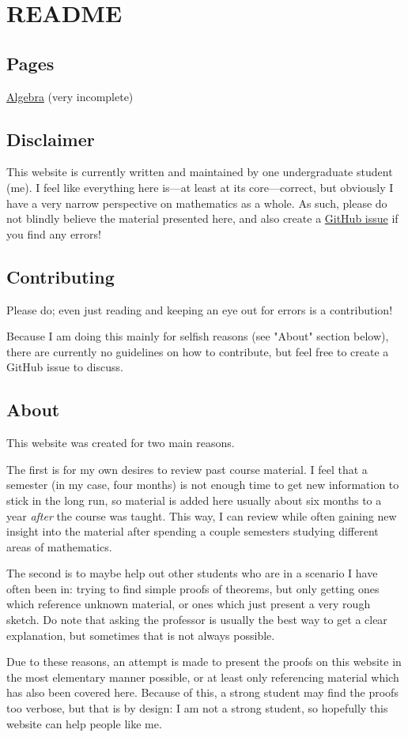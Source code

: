 \documentclass{scrartcl}
\begin{document}
\section{README}

\subsection{Pages}

\href{algebra.html}{Algebra} (very incomplete)

\subsection{Disclaimer}

This website is currently written and maintained by one undergraduate student (me).
I feel like everything here is---at least at its core---correct, but obviously I have a very narrow perspective on
mathematics as a whole.
As such, please do not blindly believe the material presented here, and also create a
\href{https://github.com/xtevenx/ugm/issues}{GitHub issue} if you find any errors!

\subsection{Contributing}

Please do; even just reading and keeping an eye out for errors is a contribution!

Because I am doing this mainly for selfish reasons (see "About" section below), there are currently no guidelines on
how to contribute, but feel free to create a GitHub issue to discuss.

\subsection{About}

This website was created for two main reasons.

The first is for my own desires to review past course material.
I feel that a semester (in my case, four months) is not enough time to get new information to stick in the long run, so
material is added here usually about six months to a year \textit{after} the course was taught.
This way, I can review while often gaining new insight into the material after spending a couple semesters studying
different areas of mathematics.

The second is to maybe help out other students who are in a scenario I have often been in: trying to find simple proofs
of theorems, but only getting ones which reference unknown material, or ones which just present a very rough sketch.
Do note that asking the professor is usually the best way to get a clear explanation, but sometimes that is not always
possible.

Due to these reasons, an attempt is made to present the proofs on this website in the most elementary manner possible,
or at least only referencing material which has also been covered here.
Because of this, a strong student may find the proofs too verbose, but that is by design: I am not a strong student, so
hopefully this website can help people like me.
\end{document}
